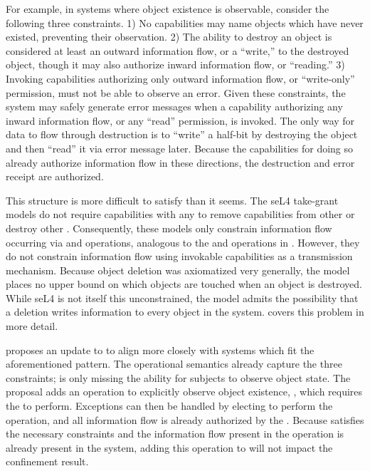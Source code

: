 For example, in systems where object existence is observable, consider the following three constraints.
1) No capabilities may name objects which have never existed, preventing their observation.
2) The ability to destroy an object is considered at least an outward information flow, or a ``write,'' to the destroyed object, though it may also authorize inward information flow, or ``reading.''
3) Invoking capabilities authorizing only outward information flow, or ``write-only'' permission, must not be able to observe an error.
Given these constraints, the system may safely generate error messages when a capability authorizing any inward information flow, or any ``read'' permission, is invoked.
The only way for data to flow through destruction is to ``write'' a half-bit by destroying the object and then ``read'' it via error message later.
Because the capabilities for doing so already authorize information flow in these directions, the destruction and error receipt are authorized.

This structure is more difficult to satisfy than it seems.
The seL4 take-grant models \cite{Elkaduwe:Thesis} \cite{Boyton_ssv2009} do not require capabilities with any \TMaccessRights{} to remove capabilities from other \TMobjs{} or destroy other \TMobjs{}.
Consequently, these models only constrain information flow occurring via  and  operations, analogous to the \NMread{} and \NMwrite{} operations in \TMmodelName{}.
However, they do not constrain information flow using invokable capabilities as a transmission mechanism.
Because object deletion was axiomatized very generally, the model places no upper bound on which objects are touched when an object is destroyed.
While seL4 is not itself this unconstrained, the model admits the possibility that a deletion writes information to every object in the system.
 covers this problem in more detail.

 proposes an update to \TMmodelName{} to align more closely with systems which fit the aforementioned pattern.
The \TMmodelName{} operational semantics already capture the three constraints; \TMmodelName{} is only missing the ability for subjects to observe object state.
The proposal adds an operation to explicitly observe object existence, , which requires the \NMrd{} \TMaccessRight{} to perform.
Exceptions can then be handled by electing to perform the  operation, and all information flow is already authorized by the \NMrd{} \TMaccessRight{}.
Because \TMmodelName{} satisfies the necessary constraints and the information flow present in the  operation is already present in the system, adding this operation to \TMmodelName{} will not impact the confinement result.

